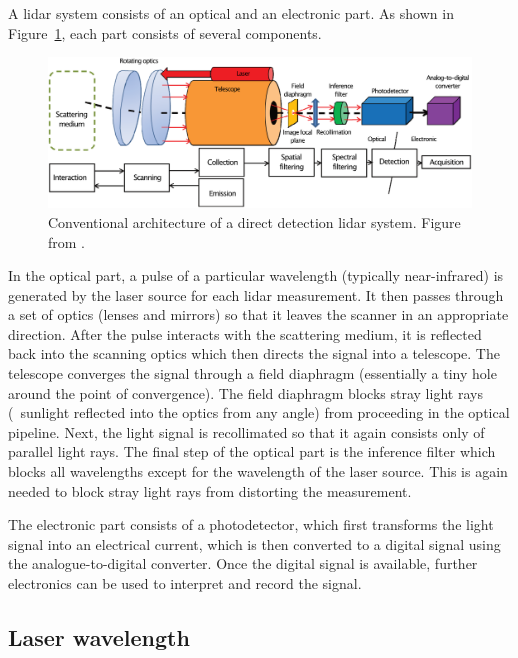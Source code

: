 A lidar system consists of an optical and an electronic part. 
As shown in Figure~\ref{fig:lidar-components}, each part consists of several components.
\begin{figure}
	\centering
	\includegraphics[width=\textwidth]{figs/lidar-components.png}
	\caption{Conventional architecture of a direct detection lidar system. Figure from \citet{Chazette16}.}%
\label{fig:lidar-components}
\end{figure}

In the optical part, a pulse of a particular wavelength (typically near-infrared) is generated by the laser source for each lidar measurement. 
It then passes through a set of  optics (lenses and mirrors) so that it leaves the scanner in an appropriate direction. 
After the pulse interacts with the scattering medium, it is reflected back into the scanning optics which then directs the signal into a telescope. 
The telescope converges the signal through a field diaphragm (essentially a tiny hole around the point of convergence). 
The field diaphragm blocks stray light rays (\eg\ sunlight reflected into the optics from any angle) from proceeding in the optical pipeline. 
Next, the light signal is recollimated so that it again consists only of parallel light rays. 
The final step of the optical part is the inference filter which blocks all wavelengths except for the wavelength of the laser source. 
This is again needed to block stray light rays from distorting the measurement.

The electronic part consists of a photodetector, which first transforms the light signal into an electrical current, which is then converted to a digital signal using the analogue-to-digital converter. 
Once the digital signal is available, further electronics can be used to interpret and record the signal.


\subsection{Laser wavelength}

